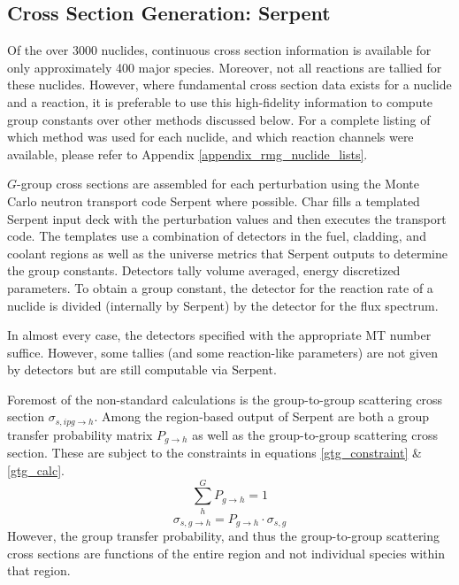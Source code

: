 \subsection{Cross Section Generation: Serpent}
\label{mg:xs_gen_serpent}
Of the over 3000 nuclides, continuous cross section information is available for only 
approximately 400 major species.  Moreover, not all reactions are tallied 
for these nuclides.  However, where fundamental cross section data exists for a nuclide
and a reaction, it is preferable to use this high-fidelity information to compute group
constants over other methods discussed below.  For a complete listing of which method was used for each nuclide, 
and which reaction channels were available, please refer to Appendix \ref{appendix_rmg_nuclide_lists}.

$G$-group cross sections are assembled for each perturbation using the Monte Carlo neutron
transport code Serpent \cite{Lepp2011} where possible.  Char fills a templated Serpent input deck with the
perturbation values and then executes the transport code.  The templates use a combination 
of detectors in the fuel, cladding, and coolant regions as well as the universe metrics that 
Serpent outputs to determine the group constants.  Detectors tally volume averaged, energy 
discretized parameters.  To obtain a group constant, the detector for the reaction rate of 
a nuclide is divided (internally by Serpent) by the detector for the flux spectrum.

In almost every case, the detectors specified with the appropriate MT number suffice.  
However, some tallies (and some reaction-like parameters) are not given by detectors
but are still computable via Serpent.

Foremost of the non-standard calculations is the group-to-group scattering cross section
$\sigma_{s,ipg\to h}$.  Among the region-based output of Serpent are both a group transfer
probability matrix $P_{g\to h}$ as well as the group-to-group scattering cross section.
These are subject to the constraints in equations \ref{gtg_constraint} \& \ref{gtg_calc}.
\begin{equation}
\label{gtg_constraint}
\sum_h^G P_{g\to h} = 1
\end{equation}
\begin{equation}
\label{gtg_calc}
\sigma_{s,g\to h} = P_{g\to h} \cdot \sigma_{s,g}
\end{equation}
However, the group transfer probability, and thus the group-to-group scattering cross sections
are functions of the entire region and not individual species within that region.  

